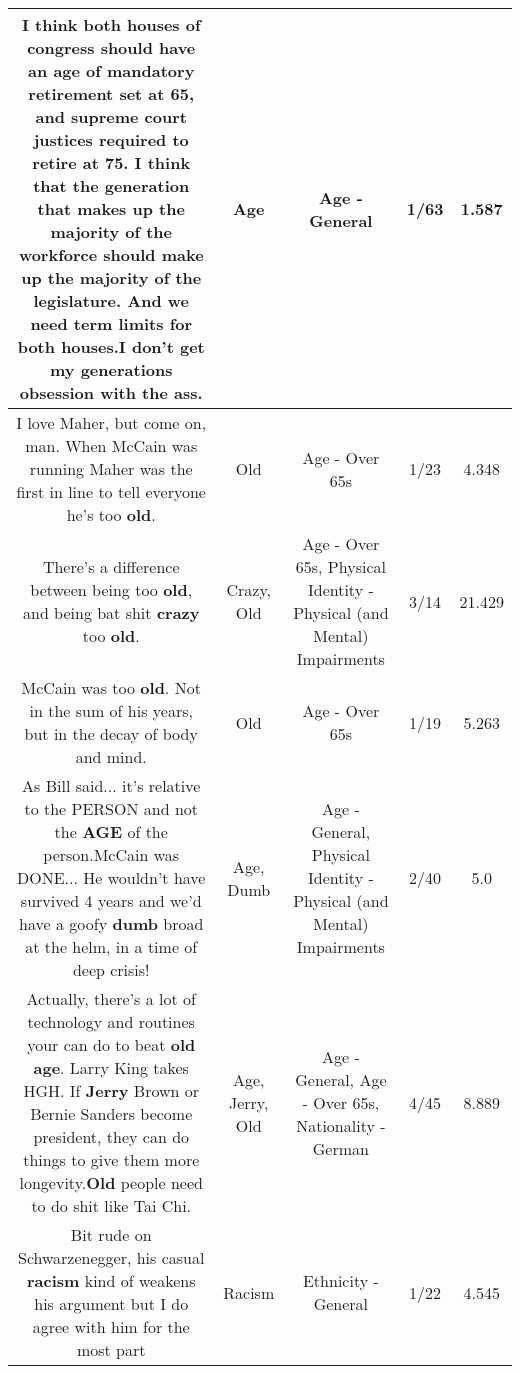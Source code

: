 \documentclass[11pt]{article}
\newlength\mylength
\begin{document}
\begin{center}
\begin{longtable}{|C{.65\mylength}|C{.30\mylength}|C{.12\mylength}|C{.12\mylength}|C{.12\mylength}|}
  \small I think both houses of congress should have an \textbf{age} of mandatory retirement set at 65, and supreme court justices required to retire at 75. I think that the generation that makes up the majority of the workforce should make up the majority of the legislature. And we need term limits for both houses.I don't get my generations obsession with the ass.\normalsize   & Age & Age - General & 1/63 & 1.587 \\  \hline
  \small I love Maher, but come on, man. When McCain was running Maher was the first in line to tell everyone he's too \textbf{old}.\normalsize   & Old & Age - Over 65s & 1/23 & 4.348 \\  \hline
  \small There's a difference between being too \textbf{old}, and being bat shit \textbf{crazy} too \textbf{old}.\normalsize   & Crazy, Old & Age - Over 65s, Physical Identity - Physical (and Mental) Impairments & 3/14 & 21.429 \\  \hline
  \small McCain was too \textbf{old}. Not in the sum of his years, but in the decay of body and mind.\normalsize   & Old & Age - Over 65s & 1/19 & 5.263 \\  \hline
  \small As Bill said... it's relative to the PERSON and not the \textbf{AGE} of the person.McCain was DONE... He wouldn't have survived 4 years and we'd have a goofy \textbf{dumb} broad at the helm, in a time of deep crisis!\normalsize   & Age, Dumb & Age - General, Physical Identity - Physical (and Mental) Impairments & 2/40 & 5.0 \\  \hline
  \small Actually, there's a lot of technology and routines your can do to beat \textbf{old} \textbf{age}. Larry King takes HGH. If \textbf{Jerry} Brown or Bernie Sanders become president, they can do things to give them more longevity.\textbf{Old} people need to do shit like Tai Chi.\normalsize   & Age, Jerry, Old & Age - General, Age - Over 65s, Nationality - German & 4/45 & 8.889 \\  \hline
  \small Bit rude on Schwarzenegger, his casual \textbf{racism} kind of weakens his argument but I do agree with him for the most part\normalsize   & Racism & Ethnicity - General & 1/22 & 4.545 \\  \hline

\end{longtable}
\end{center}
\end{document}
